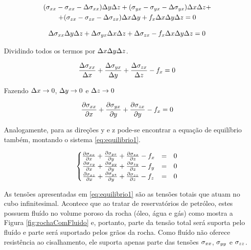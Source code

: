 \begin{multline} \label{eq:equilibrio0}
   (\stxx - \stxx - \Delta \stxx) \Dy\Dz + (\styx - \styx - \Delta \styx)\Dx\Dz  +\\
   + (\stzx - \stzx - \Delta\stzx) \Dx\Dy + f_x\Dx\Dy\Dz = 0
\end{multline}


\begin{equation}
 \Delta \stxx \Dy\Dz + \Delta \styx\Dx\Dz + \Delta\stzx - f_x\Dx\Dy\Dz = 0
\end{equation}

Dividindo todos os termos por $\Dx\Dy\Dz$.


\begin{equation}
\frac{ \Delta \stxx }{ \Dx } + \frac{\Delta \styx}{ \Dy } + \frac{\Delta\stzx}{ \Dz } - f_x = 0
\end{equation}

Fazendo $\Dx \rightarrow 0$, $\Dy \rightarrow 0 $ e $\Dz \rightarrow 0$

\begin{equation}
\dx[\stxx] + \dy[\styx] + \dy[\stzx] - f_x = 0
\end{equation}

Analogamente, para as direções y e z pode-se encontrar a equação de equilíbrio também, montando o sistema \eqref{eq:equilibrio1}.

\begin{equation}
\label{eq:equilibrio1}
\left\{\begin{matrix}
 \dx[\stxx] + \dy[\styx] + \dz[\stzx] - f_x & = & 0\\
 \dx[\stxy] + \dy[\styy] + \dz[\stzy] - f_y & = & 0\\
 \dx[\stxz] + \dy[\styz] + \dz[\stzz] - f_z & = & 0
\end{matrix}\right.
\end{equation}


As tensões apresentadas em \eqref{eq:equilibrio1} são as tensões totais que atuam no cubo infinitesimal. Acontece que ao tratar de reservatórios de petróleo, estes possuem fluído no volume poroso da rocha (óleo, água e gás) como mostra a Figura \ref{fig:rochaComFluido} e, portanto, parte da tensão total será suporta pelo fluído e parte será suportado pelos grãos da rocha. Como fluído não oferece resistência ao cisalhamento, ele suporta apenas parte das tensões $\stxx$, $\styy$ e $\stzz$.

